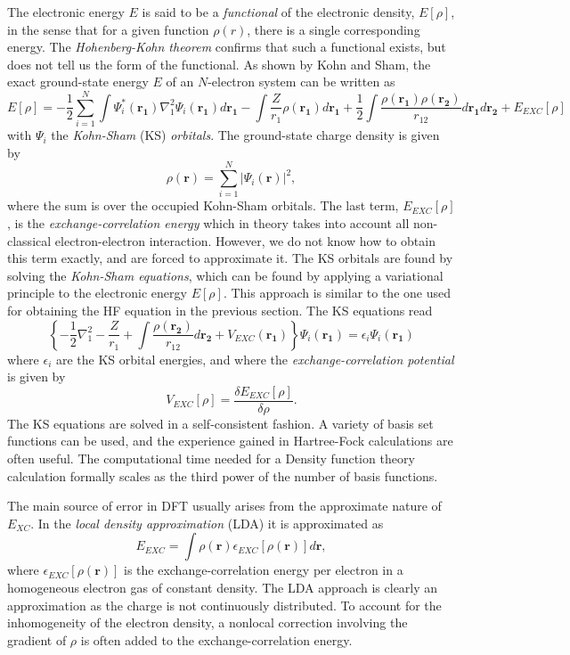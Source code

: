 The electronic energy $E$ is said to be a \emph{functional} of the
electronic density, $E[\rho]$, in the sense that for a given function
$\rho(r)$, there is a single corresponding energy. The  
\emph{Hohenberg-Kohn theorem} \cite{hohenbergkohn1964} confirms that such
a functional exists, but does not tell us the form of the
functional. As shown by Kohn and Sham, the exact ground-state energy
$E$ of an $N$-electron system can be written as
\[
  E[\rho] = -\frac{1}{2} \sum_{i=1}^N\int
  \Psi_i^*(\mathbf{r_1})\nabla_1^2 \Psi_i(\mathbf{r_1}) d\mathbf{r_1}
  - \int \frac{Z}{r_1} \rho(\mathbf{r_1}) d\mathbf{r_1} +
  \frac{1}{2} \int\frac{\rho(\mathbf{r_1})\rho(\mathbf{r_2})}{r_{12}}
  d\mathbf{r_1}d\mathbf{r_2} + E_{EXC}[\rho]
\]
with $\Psi_i$ the \emph{Kohn-Sham} (KS) \emph{orbitals}. The
ground-state charge density is given by
\[
  \rho(\mathbf{r}) = \sum_{i=1}^N|\Psi_i(\mathbf{r})|^2, 
\]
where the sum is over the occupied Kohn-Sham orbitals. The last term,
$E_{EXC}[\rho]$, is the \emph{exchange-correlation energy} which in
theory takes into account all non-classical electron-electron
interaction. However, we do not know how to obtain this term exactly,
and are forced to approximate it. The KS orbitals are found by solving
the \emph{Kohn-Sham equations}, which can be found by applying a
variational principle to the electronic energy $E[\rho]$. This approach
is similar to the one used for obtaining the HF equation in the previous 
section. The KS equations read
\begin{equation}
  \left\{ -\frac{1}{2}\nabla_1^2 - \frac{Z}{r_1} + \int 
  \frac{\rho(\mathbf{r_2})}{r_{12}} d\mathbf{r_2} +
  V_{EXC}(\mathbf{r_1}) \right\} \Psi_i(\mathbf{r_1}) =
  \epsilon_i \Psi_i(\mathbf{r_1})
  \label{eq:ks}
\end{equation}
where $\epsilon_i$ are the KS orbital energies, and where the 
\emph{exchange-correlation potential} is given by
\begin{equation}
  V_{EXC}[\rho] = \frac{\delta E_{EXC}[\rho]}{\delta \rho}.
  \label{eq:vexc}
\end{equation}
The KS equations are solved in a self-consistent fashion. A variety of
basis set functions  can be used, and the experience gained in Hartree-Fock
calculations are often useful. The computational time needed for a Density function theory
calculation formally scales as the third power of the number of basis
functions. 

The main source of error in DFT usually arises from the approximate
nature of $E_{XC}$. In the \emph{local density approximation} (LDA) it
is approximated as
\begin{equation}
  E_{EXC} = \int \rho(\mathbf{r})\epsilon_{EXC}[\rho(\mathbf{r})]
  d\mathbf{r},
  \label{eq:localapprox}
\end{equation}
where $\epsilon_{EXC}[\rho(\mathbf{r})]$ is the exchange-correlation
energy per electron in a homogeneous electron gas of constant density.
The LDA approach is clearly an approximation as the charge is not
continuously distributed. To account for the inhomogeneity of the
electron density, a nonlocal correction involving the gradient of
$\rho$ is often added to the exchange-correlation energy.
